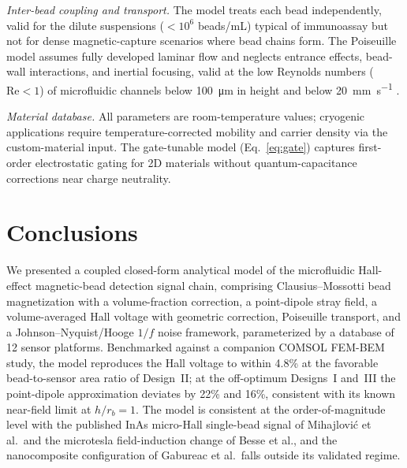 \documentclass[pdflatex,sn-basic]{sn-jnl}
\theoremstyle{thmstyleone}
\theoremstyle{thmstyletwo}
\theoremstyle{thmstylethree}
\begin{document}
\textit{Inter-bead coupling and transport.} The model treats each bead independently, valid for the dilute suspensions ($< 10^6$ beads/mL) typical of immunoassay but not for dense magnetic-capture scenarios where bead chains form. The Poiseuille model assumes fully developed laminar flow and neglects entrance effects, bead-wall interactions, and inertial focusing, valid at the low Reynolds numbers ($\text{Re} < 1$) of microfluidic channels below \SI{100}{\micro\meter} in height and below \SI{20}{\milli\meter\per\second} \citep{hewlin2023}.

\textit{Material database.} All parameters are room-temperature values; cryogenic applications require temperature-corrected mobility and carrier density via the custom-material input. The gate-tunable model (Eq.~\eqref{eq:gate}) captures first-order electrostatic gating for 2D materials without quantum-capacitance corrections near charge neutrality.

\section{Conclusions}\label{sec:conclusions}

We presented a coupled closed-form analytical model of the microfluidic Hall-effect magnetic-bead detection signal chain, comprising Clausius--Mossotti bead magnetization with a volume-fraction correction, a point-dipole stray field, a volume-averaged Hall voltage with geometric correction, Poiseuille transport, and a Johnson--Nyquist/Hooge $1/f$ noise framework, parameterized by a database of 12 sensor platforms. Benchmarked against a companion COMSOL FEM-BEM study, the model reproduces the Hall voltage to within 4.8\% at the favorable bead-to-sensor area ratio of Design~II; at the off-optimum Designs~I and~III the point-dipole approximation deviates by 22\% and 16\%, consistent with its known near-field limit at $h/r_b = 1$. The model is consistent at the order-of-magnitude level with the published InAs micro-Hall single-bead signal of Mihajlovi\'{c} et al.\ and the microtesla field-induction change of Besse et al., and the nanocomposite configuration of Gabureac et al.\ falls outside its validated regime.
\end{document}
